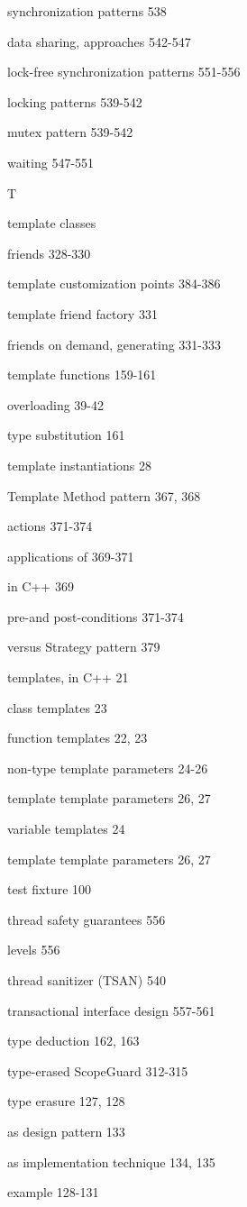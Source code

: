 synchronization patterns 538

data sharing, approaches 542-547

lock-free synchronization patterns 551-556

locking patterns 539-542

mutex pattern 539-542

waiting 547-551

T

template classes

friends 328-330

template customization points 384-386

template friend factory 331

friends on demand, generating 331-333

template functions 159-161

overloading 39-42

type substitution 161

template instantiations 28

Template Method pattern 367, 368

actions 371-374

applications of 369-371

in C++ 369

pre-and post-conditions 371-374

versus Strategy pattern 379

templates, in C++ 21

class templates 23

function templates 22, 23

non-type template parameters 24-26

template template parameters 26, 27

variable templates 24

template template parameters 26, 27

test fixture 100

thread safety guarantees 556

levels 556

thread sanitizer (TSAN) 540

transactional interface design 557-561

type deduction 162, 163

type-erased ScopeGuard 312-315

type erasure 127, 128

as design pattern 133

as implementation technique 134, 135

example 128-131

